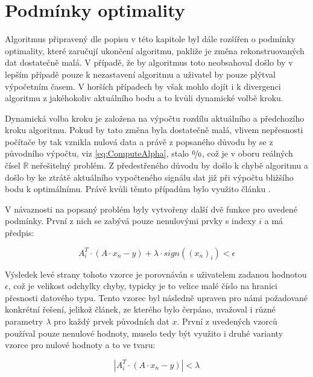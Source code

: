 \documentclass[FM,BP]{tulthesis}
\newcounter{Vzorce}
\begin{document}
\section{Podmínky optimality}
\label{subch:stopCrit}
Algoritmus připravený dle popisu v této kapitole byl dále rozšířen o podmínky optimality, které zaručují ukončení algoritmu, pakliže je změna rekonstruovaných dat dostatečně malá. V případě, že by algoritmus toto neobsahoval došlo by v lepším případě pouze k nezastavení algoritmu a uživatel by pouze plýtval výpočetním časem. V horších případech by však mohlo dojít i k divergenci algoritmu z jakéhokoliv aktuálního bodu a to kvůli dynamické volbě kroku. 

Dynamická volba kroku je založena na výpočtu rozdílu aktuálního a předchozího kroku algoritmu. Pokud by tato změna byla dostatečně malá, vlivem nepřesnosti počítače by tak vznikla nulová data a právě z popsaného důvodu by se z původního výpočtu, viz \ref{eq:ComputeAlpha}, stalo $\nicefrac{0}{0}$, což je v oboru reálných čísel $\mathbb{R}$ neřešitelný problém. Z předestřeného důvodu by došlo k chybě algoritmu a došlo by ke ztrátě aktuálního vypočteného signálu dat již při výpočtu bližšího bodu k optimálnímu. Právě kvůli těmto případům bylo využito článku \cite{homotopy}. 

V návaznosti na popsaný problém byly vytvořeny další dvě funkce pro uvedené podmínky. První z nich se zabývá pouze nenulovými prvky s indexy $i$ a má předpis:

\begin{equation} \label{eq:homotopy1}  \tag{Vzorec \theVzorce}
A_{i}^{T}\cdot(A \cdot x_{n} - y) + \lambda \cdot sign((x_{n})_{i}) < \epsilon
\end{equation}

Výsledek levé strany tohoto vzorce je porovnáván s uživatelem zadanou hodnotou $\epsilon$, což je velikost odchylky chyby, typicky je to velice malé číslo na hranici přesnosti datového typu. Tento vzorec byl následně upraven pro námi požadované konkrétní řešení, jelikož článek, ze kterého bylo čerpáno, uvažoval i různé parametry $\lambda$ pro každý prvek původních dat $x$. První z uvedených vzorců používal pouze nenulové hodnoty, muselo tedy být využito i druhé varianty vzorce pro nulové hodnoty a to ve tvaru:

\begin{equation} \label{eq:homotopy2}  \tag{Vzorec \theVzorce}
\left|A_{i}^{T} \cdot (A \cdot x_{n} - y)\right| < \lambda
\end{equation}
\end{document}
